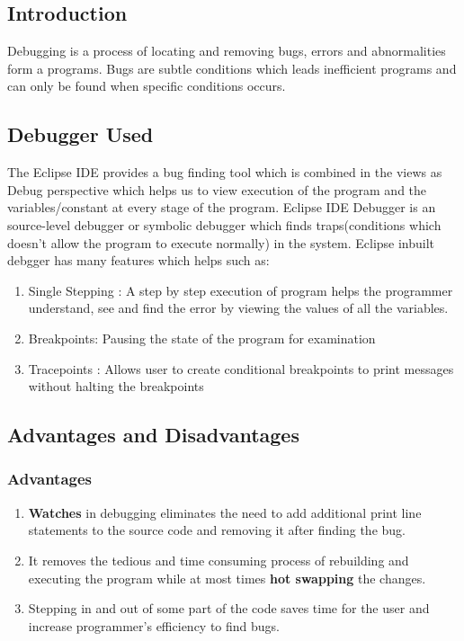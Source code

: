 \documentclass[a4paper, 11pt]{article}
\begin{document}
\subsection{Introduction}
Debugging is a process of locating and removing bugs, errors and abnormalities form a programs. Bugs are subtle conditions which leads inefficient programs and can only be found when specific conditions occurs.
\subsection{Debugger Used}
The Eclipse IDE provides a bug finding tool which is combined in the views as Debug perspective which helps us to view execution of the program and the variables/constant at every stage of the program. Eclipse IDE Debugger is an source-level debugger or symbolic debugger which finds traps(conditions which doesn't allow the program to execute normally) in the system. Eclipse inbuilt debgger has many features which helps such as:\cite{wikipedaDebugger} \cite{eclipse}
\begin{enumerate}
    \item Single Stepping : A step by step execution of program helps the programmer understand, see and find the error by viewing the values of all the variables.
    \item Breakpoints: Pausing the state of the program for examination 
    \item Tracepoints : Allows user to create conditional breakpoints to print messages without halting the breakpoints
\end{enumerate}
\subsection{Advantages and Disadvantages}
\subsubsection{Advantages}
\begin{enumerate}
    \item \textbf{Watches} in debugging eliminates the need to add additional print line statements to the source code and removing it after finding the bug.
    \item It removes the tedious and time consuming process of rebuilding and executing the program while at most times \textbf{hot swapping} the changes.
    \item Stepping in and out of some part of the code saves time for the user and increase programmer's efficiency to find bugs.
\end{enumerate}
\end{document}
